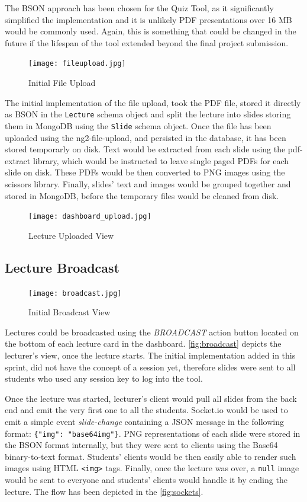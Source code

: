 The BSON approach has been chosen for the Quiz Tool, as it significantly simplified the implementation and it is
unlikely PDF presentations over 16 MB would be commonly used. Again, this is something that could be changed
in the future if the lifespan of the tool extended beyond the final project submission.

\begin{figure}[h!]
    \centering
    \texttt{[image: fileupload.jpg]}
    \caption{Initial File Upload}
    \label{fig:initialfileupload}
\end{figure}

The initial implementation of the file upload, took the PDF file, stored it directly as BSON in the
\texttt{Lecture} schema object and split the lecture into slides storing them in MongoDB using
the \texttt{Slide} schema object. Once the file has been uploaded using the ng2-file-upload\cite{51},
and persisted in the database, it has been stored temporarly on disk. Text would be extracted from
each slide using the pdf-extract\cite{52} library, which would be instructed to leave single paged
PDFs for each slide on disk. These PDFs would be then converted to PNG images using the scissors\cite{53}
library. Finally, slides' text and images would be grouped together and stored in MongoDB, before the
temporary files would be cleaned from disk.

\begin{figure}[ht]
    \centering
    \texttt{[image: dashboard\_upload.jpg]}
    \caption{Lecture Uploaded View}
    \label{fig:dashboarduploaded}
\end{figure}

\subsection{Lecture Broadcast}
\begin{figure}[h!]
    \centering
    \texttt{[image: broadcast.jpg]}
    \caption{Initial Broadcast View}
    \label{fig:broadcast}
\end{figure}
Lectures could be broadcasted using the \textit{BROADCAST} action button located on the bottom
of each lecture card in the dashboard. \autoref{fig:broadcast} depicts the lecturer's view,
once the lecture starts. The initial implementation added in this sprint, did not have the
concept of a session yet, therefore slides were sent to all students who used any session key
to log into the tool.

Once the lecture was started, lecturer's client would pull all slides from the back end and emit the very
first one to all the students. Socket.io would be used to emit a simple event \textit{slide-change} containing
a JSON message in the following format: \texttt{\{"img": "base64img"\}}. PNG representations of each slide
were stored in the BSON format internally, but they were sent to clients using the Base64 binary-to-text format\cite{54}.
Students' clients would be then easily able to render such images using HTML \texttt{<img>} tags. Finally,
once the lecture was over, a \texttt{null} image would be sent to everyone and students' clients would
handle it by ending the lecture. The flow has been depicted in the \autoref{fig:sockets}.

